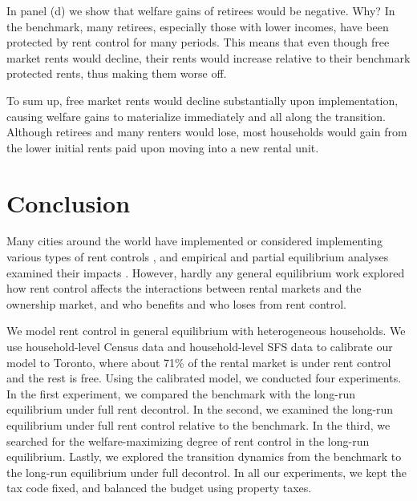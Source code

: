 \documentclass[parskip=full]{article}
\begin{document}
In panel (d) we show that welfare gains of retirees would be negative. Why? In the benchmark, many retirees, especially those with lower incomes, have been protected by rent control for many periods. This means that even though free market rents would decline, their rents would increase relative to their benchmark protected rents, thus making them worse off.

To sum up, free market rents would decline substantially upon implementation, causing welfare gains to materialize immediately and all along the transition. Although retirees and many renters would lose, most households would gain from the lower initial rents paid upon moving into a new rental unit.

\section{Conclusion}\label{sec:conclusion}

Many cities around the world have implemented or considered implementing various types of rent controls \citep{fraser-1981}, and empirical and partial equilibrium analyses examined their impacts \citep{hayek-1929,fs-1946,fallis-1985,diamond-2019}. However, hardly any general equilibrium work explored how rent control affects the interactions between rental markets and the ownership market, and who benefits and who loses from rent control. 

We model rent control in general equilibrium with heterogeneous households. We use household-level Census data and household-level SFS data to calibrate our model to Toronto, where about 71\% of the rental market is under rent control and the rest is free. Using the calibrated model, we conducted four experiments. In the first experiment, we compared the benchmark with the long-run equilibrium under full rent decontrol. In the second, we examined the long-run equilibrium under full rent control relative to the benchmark. In the third, we searched for the welfare-maximizing degree of rent control in the long-run equilibrium. Lastly, we explored the transition dynamics from the benchmark to the long-run equilibrium under full decontrol. In all our experiments, we kept the tax code fixed, and balanced the budget using property taxes.
\end{document}
